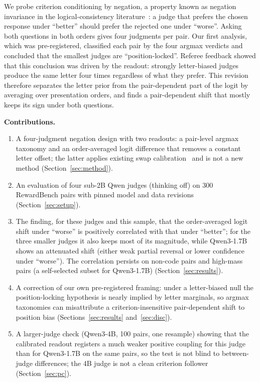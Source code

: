 \documentclass[conference]{IEEEtran}
\begin{document}
We probe criterion conditioning by negation, a property known as negation invariance in the logical-consistency
literature~\cite{liu2024aligning}: a judge that prefers the chosen response under ``better'' should prefer the
rejected one under ``worse''. Asking both questions in both orders gives four judgments per pair. Our first
analysis, which was pre-registered, classified each pair by the four argmax verdicts and concluded that the
smallest judges are ``position-locked''. Referee feedback showed that this conclusion was driven by the
readout: strongly letter-biased judges produce the same letter four times regardless of what they prefer. This
revision therefore separates the letter prior from the pair-dependent part of the logit by averaging over
presentation orders, and finds a pair-dependent shift that mostly keeps its sign under both questions.

\textbf{Contributions.}
\begin{enumerate}
\item A four-judgment negation design with two readouts: a pair-level argmax taxonomy and an order-averaged
logit difference that removes a constant letter offset; the latter applies existing swap
calibration~\cite{wang2023fair,zeng2024rankfusion,wang2025distribution} and is not a new method (Section~\ref{sec:method}).
\item An evaluation of four sub-2B Qwen judges (thinking off) on 300 RewardBench pairs with pinned model and
data revisions (Section~\ref{sec:setup}).
\item The finding, for these judges and this sample, that the order-averaged logit shift under ``worse'' is
positively correlated with that under ``better''; for the three smaller judges it also keeps most of its
magnitude, while Qwen3-1.7B shows an attenuated shift (either weak partial reversal or lower confidence under ``worse''). The correlation persists on non-code pairs and
high-mass pairs (a self-selected subset for Qwen3-1.7B) (Section~\ref{sec:results}).
\item A correction of our own pre-registered framing: under a letter-biased null the position-locking
hypothesis is nearly implied by letter marginals, so argmax taxonomies can misattribute a criterion-insensitive
pair-dependent shift to position bias (Sections~\ref{sec:results} and~\ref{sec:disc}).
\item A larger-judge check (Qwen3-4B, 100 pairs, one resample) showing that the calibrated readout registers a
much weaker positive coupling for this judge than for Qwen3-1.7B on the same pairs, so the test is not blind to
between-judge differences; the 4B judge is not a clean criterion follower (Section~\ref{sec:pc}).
\end{enumerate}
\end{document}
